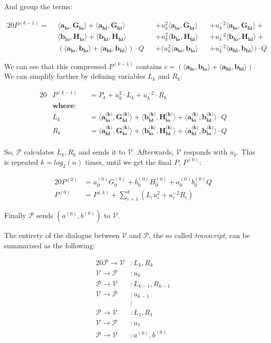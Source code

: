 \documentclass{article}
\newcommand{\eq}[1]{\begin{alignat*}{20}#1\end{alignat*}}
\renewcommand{\vec}[1]{\boldsymbol{#1}}
\newcommand{\V}{\mathcal{V}}
\renewcommand{\P}{\mathcal{P}}
\newcommand{\dotp}[2]{\langle #1, #2 \rangle}
\newcommand{\opn}[1]{\operatorname{#1}}
\newcommand{\veclo}[1]{\vec{#1_{\opn{lo}}}}
\newcommand{\vechi}[1]{\vec{#1_{\opn{hi}}}}
\begin{document}
And group the terms:

\eq{
	P^{(k-1)} = \: \:
	        &\dotp{\veclo{a}}{\veclo{G}}            +
	         \dotp{\vechi{a}}{\vechi{G}}          &&+
	u^2_k    \dotp{\veclo{a}}{\vechi{G}}          &&+
	u^{-2}_k \dotp{\veclo{a}}{\vechi{G}}            +\\
	        &\dotp{\veclo{b}}{\veclo{H}}            +
	         \dotp{\vechi{b}}{\vechi{H}}          &&+
	u^2_k    \dotp{\veclo{b}}{\vechi{H}}          &&+
	u^{-2}_k \dotp{\veclo{b}}{\vechi{H}}            +\\
	       &(\dotp{\veclo{a}}{\veclo{b}}            +
		       \dotp{\vechi{a}}{\vechi{b}}) \cdot Q &&+
	(u^2_k   \dotp{\veclo{a}}{\veclo{b}}          &&+
	u^{-2}_k \dotp{\vechi{a}}{\vechi{b}}) \cdot Q
}

We can see that this compressed $P^{(k-1)}$ contains $c = (\dotp{\veclo{a}}{\veclo{b}} + \dotp{\vechi{a}}{\vechi{b}})$. We can simplify further by defining variables $L_k$ and $R_k$: 

\eq{
	&P^{(k-1)} &&= P_k + u^2_k \cdot L_k + u^{-2}_k \cdot R_k \\
	&\textbf{where:} \\
	&L_k     &&= \dotp{\veclo{a^{\text{(k)}}}}{\vechi{G^{\text{(k)}}}} +
	             \dotp{\vechi{b^{\text{(k)}}}}{\veclo{H^{\text{(k)}}}} + 
	             \dotp{\veclo{a^{\text{(k)}}}}{\vechi{b^{\text{(k)}}}} \cdot Q \\
	&R_k     &&= \dotp{\vechi{a^{\text{(k)}}}}{\veclo{G^{\text{(k)}}}} +
	             \dotp{\veclo{b^{\text{(k)}}}}{\vechi{H^{\text{(k)}}}} +
	             \dotp{\vechi{a^{\text{(k)}}}}{\veclo{b^{\text{(k)}}}} \cdot Q \\
}

So, $\P$ calculates $L_k, R_k$ and sends it to $\V$. Afterwards,
$\V$ responds with $u_k$. This is repeated $k = log_2(n)$ times,
until we get the final $P$, $P^{(0)}$:

\eq{
	P^{(0)} &= a^{(0)}_0 G^{(0)}_0 + b^{(0)}_0 H^{(0)}_0 + a^{(0)}_0 b^{(0)}_0 Q \\
	P^{(0)} &= P^{(k)} + \sum^k_{i=1}(L_i u^2_i + u^{-2}_i R_i)
}

Finally $\P$ sends $(a^{(0)}, b^{(0)})$ to $\V$.

The entirety of the dialogue between $\V$ and $\P$,
the so called \textit{transcript}, can be summarized as the following:

\eq{
	\P \rightarrow \V &: L_k, R_k \\
	\V \rightarrow \P &: u_k \\[5pt]
	\P \rightarrow \V &: L_{k-1}, R_{k-1} \\
	\V \rightarrow \P &: u_{k-1} \\[-5pt]
	                  &\vdots \\
	\P \rightarrow \V &: L_{1}, R_{1} \\
	\V \rightarrow \P &: u_{1} \\[5pt]
	\P \rightarrow \V &: a^{(0)}, b^{(0)} \\
}
\end{document}
